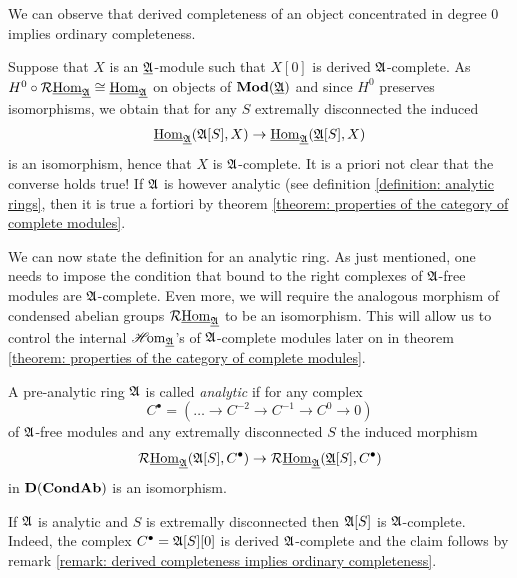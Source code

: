 We can observe that derived completeness of an object concentrated in degree $0$ implies ordinary completeness.
\begin{remark}
	\label{remark: derived completeness implies ordinary completeness}
	
	Suppose that $X$ is an ${\underline{{\mathfrak{A}}}}$-module such that $X[0]$ is derived ${\mathfrak{A}}$-complete. As $H^0\circ \mathcal{R}{\underline{\operatorname{Hom}}}_{\underline{{\mathfrak{A}}}} \cong {\underline{\operatorname{Hom}}}_{\underline{{\mathfrak{A}}}}$ on objects of ${{\mathbf{Mod}}({\underline{{\mathfrak{A}}}})}$ and since $H^0$ preserves isomorphisms, we obtain that for any $S$ extremally disconnected the induced
		$${\underline{\operatorname{Hom}}}_{\underline{{\mathfrak{A}}}}({{{\mathfrak{A}}[S]}}, X) \to {\underline{\operatorname{Hom}}}_{\underline{{\mathfrak{A}}}}({{{\underline{{\mathfrak{A}}}}[S]}}, X)$$
	is an isomorphism, hence that $X$ is ${\mathfrak{A}}$-complete. It is a priori not clear that the converse holds true! If ${\mathfrak{A}}$ is however analytic (see definition \ref{definition: analytic rings}, then it is true a fortiori by theorem \ref{theorem: properties of the category of complete modules}.
\end{remark}

We can now state the definition for an analytic ring. As just mentioned, one needs to impose the condition that bound to the right complexes of ${\mathfrak{A}}$-free modules are ${\mathfrak{A}}$-complete. Even more, we will require the analogous morphism of condensed abelian groups $\mathcal{R}{\underline{\operatorname{Hom}}}_{\underline{{\mathfrak{A}}}}$ to be an isomorphism. This will allow us to control the internal ${\operatorname{\mathscr{H}\!om}}_{\underline{{\mathfrak{A}}}}$'s of ${\mathfrak{A}}$-complete modules later on in theorem \ref{theorem: properties of the category of complete modules}.
\begin{definition}
	\label{definition: analytic rings}
	
	A pre-analytic ring ${\mathfrak{A}}$ is called \emph{analytic} if for any complex
	$$C^\bullet = \left(\dots \to C^{-2} \to C^{-1} \to C^0 \to 0\right)$$
	of ${\mathfrak{A}}$-free modules and any extremally disconnected $S$ the induced morphism
	$$\mathcal{R}{\underline{\operatorname{Hom}}}_{\underline{{\mathfrak{A}}}}({\mathfrak{A}}[S], C^\bullet) \to \mathcal{R}{\underline{\operatorname{Hom}}}_{\underline{{\mathfrak{A}}}}({\underline{{\mathfrak{A}}}}[S], C^\bullet)$$
	in ${{\mathbf{D}}({{{\mathbf{Cond}}}{{\mathbf{Ab}}}})}$ is an isomorphism.
\end{definition}

\begin{remark}
	If ${\mathfrak{A}}$ is analytic and $S$ is extremally disconnected then ${{{\mathfrak{A}}[S]}}$ is ${\mathfrak{A}}$-complete. Indeed, the complex $C^\bullet={{{\mathfrak{A}}[S]}}[0]$ is derived ${\mathfrak{A}}$-complete and the claim follows by remark \ref{remark: derived completeness implies ordinary completeness}.
\end{remark}

